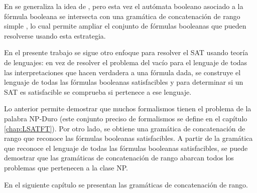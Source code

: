 \documentclass[12pt]{article}
\begin{document}
En \cite{aSRCSAT} se generaliza la idea de \cite{aCFSAT}, pero esta vez el autómata booleano asociado a la fórmula booleana se intersecta con una gramática de concatenación de rango simple \cite{mainRCGBib}, lo cual permite ampliar el conjunto de fórmulas booleanas que pueden resolverse usando esta estrategia.

En el presente trabajo se sigue otro enfoque para resolver el SAT usando teoría de lenguajes: en vez de resolver el problema del vacío para el lenguaje de todas las interpretaciones que hacen verdadera a una fórmula dada, se construye el lenguaje de todas las fórmulas booleanas satisfacibles y para determinar si un SAT es satisfacible se comprueba si pertenece a ese lenguaje.

Lo anterior permite demostrar que muchos formalismos tienen el problema de la palabra NP-Duro (este conjunto preciso de formalismos se define en el capítulo \ref{chap:LSATFT}).  Por otro lado, se obtiene una gramática de concatenación de rango que reconoce las fórmulas booleanas satisfacibles. A partir de la gramática que reconoce el lenguaje de todas las fórmulas booleanas satisfacibles, se puede demostrar que las gramáticas de concatenación de rango abarcan todos los problemas que pertenecen a la clase NP.

En el siguiente capítulo se presentan las gramáticas de concatenación de rango.
\end{document}
